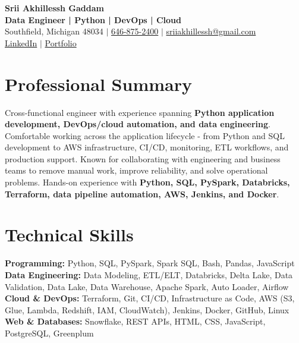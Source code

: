 \documentclass[letterpaper,10pt]{article}
\begin{document}
\fontsize{9.35pt}{10.45pt}\selectfont

\begin{center}
    {\LARGE \textbf{Srii Akhillessh Gaddam}} \\[-1pt]
    \textbf{Data Engineer | Python | DevOps | Cloud} \\[2pt]
    Southfield, Michigan 48034 $|$
    \href{tel:6468752400}{646-875-2400} $|$
    \href{mailto:sriiakhillessh@gmail.com}{sriiakhillessh@gmail.com} \\[1pt]
    \href{https://www.linkedin.com/in/srii-akhiilessh-gaddam-b48668191/}{LinkedIn} $|$
    \href{https://sriiakhillesshg.github.io/portfolio/}{Portfolio}
\end{center}
\vspace{-8pt}

\section{Professional Summary}
\small{Cross-functional engineer with experience spanning \textbf{Python application development, DevOps/cloud automation, and data engineering}. Comfortable working across the application lifecycle - from Python and SQL development to AWS infrastructure, CI/CD, monitoring, ETL workflows, and production support. Known for collaborating with engineering and business teams to remove manual work, improve reliability, and solve operational problems. Hands-on experience with \textbf{Python, SQL, PySpark, Databricks, Terraform, data pipeline automation, AWS, Jenkins, and Docker}.}

\section{Technical Skills}
\small{
\textbf{Programming:} Python, SQL, PySpark, Spark SQL, Bash, Pandas, JavaScript \\
\textbf{Data Engineering:} Data Modeling, ETL/ELT, Databricks, Delta Lake, Data Validation, Data Lake, Data Warehouse, Apache Spark, Auto Loader, Airflow \\
\textbf{Cloud \& DevOps:} Terraform, Git, CI/CD, Infrastructure as Code, AWS (S3, Glue, Lambda, Redshift, IAM, CloudWatch), Jenkins, Docker, GitHub, Linux \\
\textbf{Web \& Databases:} Snowflake, REST APIs, HTML, CSS, JavaScript, PostgreSQL, Greenplum
}
\end{document}
